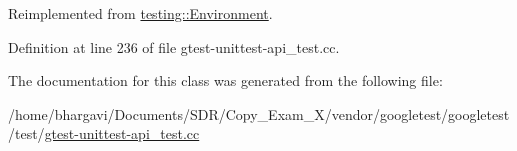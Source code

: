 Reimplemented from \hyperlink{classtesting_1_1_environment_a039bdaa705c46b9b88234cf4d3bb6254}{testing\+::\+Environment}.



Definition at line 236 of file gtest-\/unittest-\/api\+\_\+test.\+cc.



The documentation for this class was generated from the following file\+:\begin{DoxyCompactItemize}
\item 
/home/bhargavi/\+Documents/\+S\+D\+R/\+Copy\+\_\+\+Exam\+\_\+X/vendor/googletest/googletest/test/\hyperlink{gtest-unittest-api__test_8cc}{gtest-\/unittest-\/api\+\_\+test.\+cc}\end{DoxyCompactItemize}

